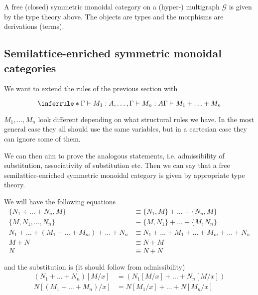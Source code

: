 \documentclass[acmsmall,screen, nonacm, anonymous]{acmart}
\begin{document}
\begin{proposition}
  A free (closed) symmetric monoidal category on a (hyper-) multigraph $\mathcal{G}$ is given by the type theory above.
  The objects are types and the morphisms are derivations (terms).
\end{proposition}

\subsection{Semilattice-enriched symmetric monoidal categories}

We want to extend the rules of the previous section with

\[
\inferrule*{\Gamma \vdash M_1 : A, \ldots, \Gamma \vdash M_n : A}{
  \Gamma \vdash M_1 + \ldots + M_n
}
\]

$M_1, \ldots, M_n$ look different depending on what structural rules we have.
In the most general case they all should use the same variables, but in a cartesian case they can ignore some of them.

We can then aim to prove the analogous statements, i.e. admissibility of substitution, associativity of substitution etc.
Then we can say that a free semilattice-enriched symmetric monoidal category is given by appropriate type theory.

We will have the following equations
\begin{align*}
  \{N_1 + \ldots + N_n, M\} &\equiv \{N_1, M\} + \ldots + \{N_n, M\}\\
  \{M, N_1, \ldots, N_n\} &\equiv \{M, N_1\} + \ldots + \{M, N_n\}\\
  N_1 + \ldots + (M_1 + \ldots + M_m)  + \ldots + N_n &\equiv N_1 + \ldots + M_1 + \ldots + M_m + \ldots + N_n\\
  M + N &\equiv N + M\\
  N &\equiv N + N
\end{align*}

and the substitution is (it should follow from admissibility)
\begin{align*}
(N_1 + \ldots + N_n)[M/x] &= (N_1[M/x] + \ldots + N_n[M/x])\\
N[(M_1 + \ldots + M_n)/x] &= N[M_1/x] + \ldots + N[M_n/x]
\end{align*}
\end{document}
